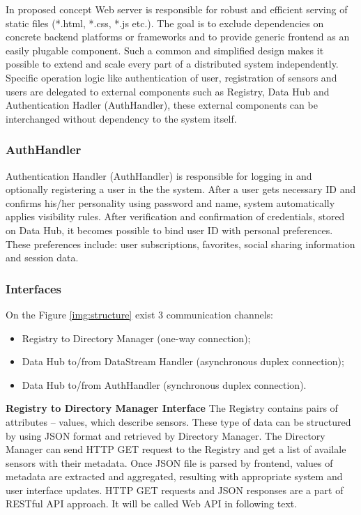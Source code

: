     In proposed concept Web server is responsible for robust and efficient serving of static files (*.html, *.css, *.js etc.). The goal is to exclude dependencies on concrete backend platforms or frameworks and to provide generic frontend as an easily plugable component. Such a common and simplified design makes it possible to extend and scale every part of a distributed system independently. Specific operation logic like authentication of user, registration of sensors and users are delegated to external components such as Registry, Data Hub and Authentication Hadler (AuthHandler), these external components can be interchanged without dependency to the system itself.

    \subsubsection{AuthHandler}
    Authentication Handler (AuthHandler) is responsible for logging in and optionally registering a user in the the system. After a user gets necessary ID and confirms his/her personality using password and name, system automatically applies visibility rules. After verification and confirmation of credentials, stored on Data Hub, it becomes possible to bind user ID with personal preferences. These preferences include: user subscriptions, favorites, social sharing information and session data.

    \subsubsection{Interfaces}
      On the Figure \ref{img:structure} exist 3 communication channels: 
      \begin{itemize}
      \item Registry to Directory Manager (one-way connection);
      \item Data Hub to/from DataStream Handler (asynchronous duplex connection);
      \item Data Hub to/from AuthHandler (synchronous duplex connection). 
      \end{itemize}

      \textbf{Registry to Directory Manager Interface}
      \newline
      The Registry contains pairs of attributes -- values, which describe sensors. These type of data can be structured by using JSON format and retrieved by Directory Manager. The Directory Manager can send HTTP GET request to the Registry and get a list of availale sensors with their metadata. Once JSON file is parsed by frontend, values of metadata are extracted and aggregated, resulting with appropriate system and user interface updates. HTTP GET requests and JSON responses are a part of RESTful API approach. It will be called Web API in following text.


